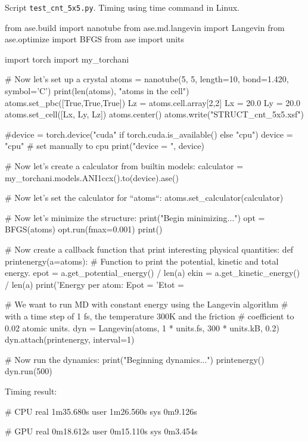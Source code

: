 \documentclass[a4paper,12pt]{article} %
\newcommand{\txtinline}[1]{\texttt{#1}}
\begin{document}
Script \txtinline{test_cnt_5x5.py}. Timing using time command in Linux.
\begin{pythoncode}
from ase.build import nanotube
from ase.md.langevin import Langevin
from ase.optimize import BFGS
from ase import units

import torch
import my_torchani

# Now let's set up a crystal
atoms = nanotube(5, 5, length=10, bond=1.420, symbol='C')
print(len(atoms), "atoms in the cell")
atoms.set_pbc([True,True,True])
Lz = atoms.cell.array[2,2]
Lx = 20.0
Ly = 20.0
atoms.set_cell([Lx, Ly, Lz])
atoms.center()
atoms.write("STRUCT_cnt_5x5.xsf")
    
#device = torch.device("cuda" if torch.cuda.is_available() else "cpu")
device = "cpu" # set manually to cpu
print("device = ", device)
    
# Now let's create a calculator from builtin models:
calculator = my_torchani.models.ANI1ccx().to(device).ase()
    
# Now let's set the calculator for ``atoms``:
atoms.set_calculator(calculator)
    
# Now let's minimize the structure:
print("Begin minimizing...")
opt = BFGS(atoms)
opt.run(fmax=0.001)
print()
    
    
# Now create a callback function that print interesting physical quantities:
def printenergy(a=atoms):
    # Function to print the potential, kinetic and total energy.
    epot = a.get_potential_energy() / len(a)
    ekin = a.get_kinetic_energy() / len(a)
    print('Energy per atom: Epot = %
          'Etot = %

# We want to run MD with constant energy using the Langevin algorithm
# with a time step of 1 fs, the temperature 300K and the friction
# coefficient to 0.02 atomic units.
dyn = Langevin(atoms, 1 * units.fs, 300 * units.kB, 0.2)
dyn.attach(printenergy, interval=1)

# Now run the dynamics:
print("Beginning dynamics...")
printenergy()
dyn.run(500)    
\end{pythoncode}

Timing result:
\begin{textcode}
# CPU
real	1m35.680s
user	1m26.560s
sys	0m9.126s
    
# GPU
real	0m18.612s
user	0m15.110s
sys	0m3.454s
\end{textcode}





\end{document}

